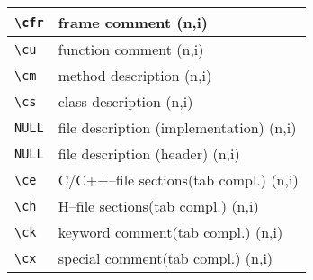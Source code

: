 \documentclass[oneside,11pt,landscape,DIV16]{scrartcl}
\begin{document}
\begin{multicols}{3}
\begin{center}
\begin{tabular}[]{|p{10mm}|p{60mm}|}
\hline \verb'\cfr'    & frame comment                           \hfill (n,i)                                     \\
\hline \verb'\cu'     & function comment                        \hfill (n,i)                                     \\
\hline \verb'\cm'     & method description                      \hfill (n,i)                                     \\
\hline \verb'\cs'     & class description                       \hfill (n,i)                                     \\
\hline \verb'NULL'    & file description (implementation)       \hfill (n,i)                                     \\
\hline \verb'NULL'    & file description (header)               \hfill (n,i)                                     \\

\hline \verb'\ce'     & C/C++--file sections\hspace{3mm}\footnotesize{(tab compl.)}    \hfill \normalsize{(n,i)} \\
\hline \verb'\ch'     & H--file sections\hspace{10mm}\footnotesize{(tab compl.)}       \hfill \normalsize{(n,i)} \\
\hline \verb'\ck'     & keyword comment\hspace{5mm}\footnotesize{(tab compl.)}         \hfill \normalsize{(n,i)} \\
\hline \verb'\cx'     & special comment\hspace{7,5mm}\footnotesize{(tab compl.)}       \hfill \normalsize{(n,i)} \\


\end{tabular}
\end{center}
\end{multicols}
\end{document}
